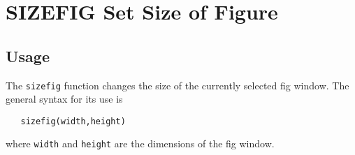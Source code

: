 \section{SIZEFIG Set Size of Figure}

\subsection{Usage}

The \verb|sizefig| function changes the size of the currently
selected fig window.  The general syntax for its use is
\begin{verbatim}
   sizefig(width,height)
\end{verbatim}
where \verb|width| and \verb|height| are the dimensions of the fig
window.
